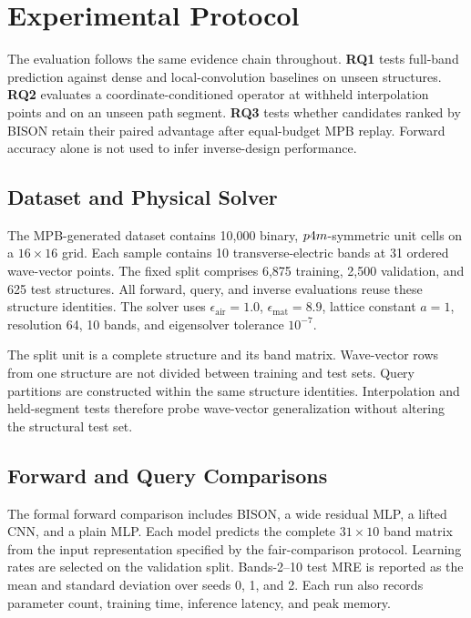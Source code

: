 
\section{Experimental Protocol}

The evaluation follows the same evidence chain throughout.
\textbf{RQ1} tests full-band prediction against dense and local-convolution
baselines on unseen structures. \textbf{RQ2} evaluates a
coordinate-conditioned operator at withheld interpolation points and on an
unseen path segment. \textbf{RQ3} tests whether candidates ranked by BISON
retain their paired advantage after equal-budget MPB replay. Forward accuracy
alone is not used to infer inverse-design performance.

\subsection{Dataset and Physical Solver}

The MPB-generated dataset contains 10,000 binary,
\(p4m\)-symmetric unit cells on a \(16\times16\) grid. Each sample
contains 10 transverse-electric bands at 31 ordered wave-vector points. The
fixed split comprises 6,875 training, 2,500 validation, and 625 test
structures. All forward, query, and inverse evaluations reuse these structure
identities. The solver uses \(\epsilon_{\mathrm{air}}=1.0\),
\(\epsilon_{\mathrm{mat}}=8.9\), lattice constant \(a=1\), resolution 64,
10 bands, and eigensolver tolerance \(10^{-7}\).

The split unit is a complete structure and its band matrix. Wave-vector rows
from one structure are not divided between training and test sets. Query
partitions are constructed within the same structure identities. Interpolation
and held-segment tests therefore probe wave-vector generalization without
altering the structural test set.

\subsection{Forward and Query Comparisons}

The formal forward comparison includes BISON, a wide residual MLP, a lifted
CNN, and a plain MLP. Each model predicts the complete \(31\times10\) band
matrix from the input representation specified by the fair-comparison
protocol. Learning rates are selected on the validation split. Bands-2--10
test MRE is reported as the mean and standard deviation over seeds 0, 1, and
2. Each run also records parameter count, training time, inference latency,
and peak memory.

